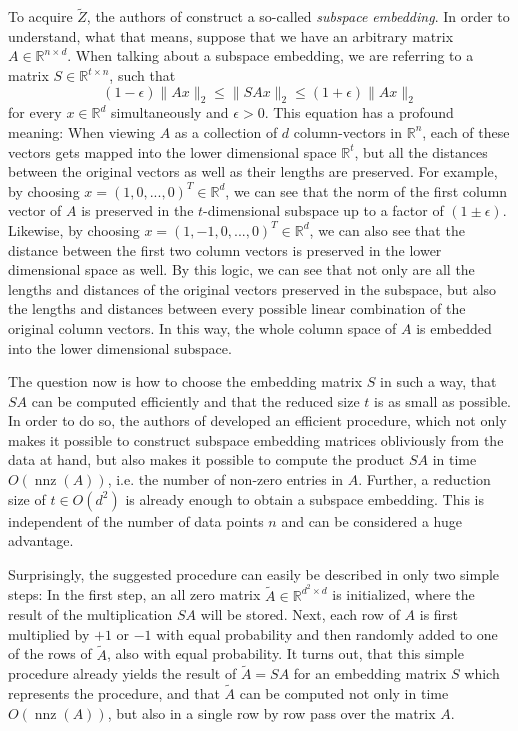 To acquire $\tilde{Z}$, the authors of \cite{woodruff-2017} construct
a so-called \textit{subspace embedding}.
In order to understand, what that means, suppose that we have an
arbitrary matrix $A \in \mathbb{R}^{n \times d}$.
When talking about a subspace embedding, we are referring to a matrix
$S \in \mathbb{R}^{t \times n}$, such that
\begin{equation*}
    (1 - \epsilon) \lVert Ax \rVert_2 \leq \lVert SAx \rVert_2
    \leq (1 + \epsilon) \lVert Ax \rVert_2
\end{equation*}
for every $x \in \mathbb{R}^d$ simultaneously and $\epsilon > 0$.
This equation has a profound meaning: When viewing $A$ as a
collection of
$d$ column-vectors in $\mathbb{R}^n$, each of these vectors gets
mapped into the lower dimensional space $\mathbb{R}^t$, but all the
distances between the original vectors as well as their lengths
are preserved. For example, by choosing
$x = (1, 0, ..., 0)^T \in \mathbb{R}^d$, we can see that the norm
of the first column vector of $A$ is preserved in the
$t$-dimensional subspace up to a factor of $(1 \pm \epsilon)$.
Likewise, by choosing $x = (1, -1, 0, ..., 0)^T \in \mathbb{R}^d$,
we can also see that the distance between the first two column
vectors is preserved in the lower dimensional space as well.
By this logic, we can see that not only are all the lengths
and distances of the original vectors preserved in the
subspace, but also
the lengths and distances between every possible linear
combination of the original column vectors. In this way, the
whole column space of $A$ is embedded into the lower dimensional
subspace.

The question now is how to choose the embedding matrix $S$ in
such a way, that $SA$ can be
computed efficiently and that the reduced size $t$ is as small
as possible. In order to do so, the authors of
\cite{woodruff-2017} developed an efficient procedure,
which not only makes it possible to construct subspace
embedding matrices obliviously from the data at hand, but
also makes it possible to compute the product $SA$
in time $O(\operatorname{nnz}(A))$, i.e. the number of
non-zero entries in $A$. Further, a reduction size of
$t \in O(d^2)$ is already enough to obtain a subspace embedding.
This is independent of the number of data points $n$ and
can be considered a huge advantage.

Surprisingly, the suggested
procedure can easily be described in only two simple steps:
In the first step, an all zero matrix
$\tilde{A} \in \mathbb{R}^{d^2 \times d}$ is initialized, where
the result of the multiplication $SA$ will be stored.
Next, each row of $A$ is first multiplied by $+1$ or $-1$
with equal probability and then randomly added to one of the
rows of $\tilde{A}$, also with equal probability.
It turns out, that this simple procedure already yields the
result of $\tilde{A} = SA$ for an embedding matrix $S$ which
represents the procedure, and that $\tilde{A}$ can be
computed not only in time $O(\operatorname{nnz}(A))$, but also
in a single row by row pass over the matrix $A$.

